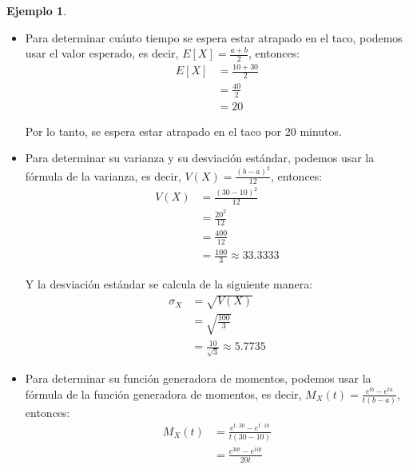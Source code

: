 \documentclass{article}
\theoremstyle{definition}
\newtheorem{example}[definition]{Ejemplo}
\theoremstyle{plain}
\theoremstyle{remark}
\begin{document}
\begin{example}
\begin{itemize}
\begin{align*}
P(X < 20) &= F(20) \\
&= \frac{20 - 10}{20} \\
&= \frac{10}{20} \\
&= \frac{1}{2} \\
&= 0.5
\end{align*}

\item Para determinar cuánto tiempo se espera estar atrapado en el taco, podemos usar el valor esperado, es decir, $E[X] = \frac{a + b}{2}$, entonces:
\begin{align*}
E[X] &= \frac{10 + 30}{2} \\
&= \frac{40}{2} \\
&= 20
\end{align*}

Por lo tanto, se espera estar atrapado en el taco por 20 minutos.

\item Para determinar su varianza y su desviación estándar, podemos usar la fórmula de la varianza, es decir, $V(X) = \frac{(b - a)^2}{12}$, entonces:
\begin{align*}
V(X) &= \frac{(30 - 10)^2}{12} \\
&= \frac{20^2}{12} \\
&= \frac{400}{12} \\
&= \frac{100}{3} \approx 33.3333
\end{align*}

Y la desviación estándar se calcula de la siguiente manera:
\begin{align*}
\sigma_X &= \sqrt{V(X)} \\
&= \sqrt{\frac{100}{3}} \\
&= \frac{10}{\sqrt{3}} \approx 5.7735
\end{align*}

\item Para determinar su función generadora de momentos, podemos usar la fórmula de la función generadora de momentos, es decir, $M_X(t) = \frac{e^{tb} - e^{ta}}{t(b - a)}$, entonces:
\begin{align*}
M_X(t) &= \frac{e^{t \cdot 30} - e^{t \cdot 10}}{t(30 - 10)} \\
&= \frac{e^{30t} - e^{10t}}{20t}
\end{align*}

\end{itemize}

\end{example}
\end{document}
